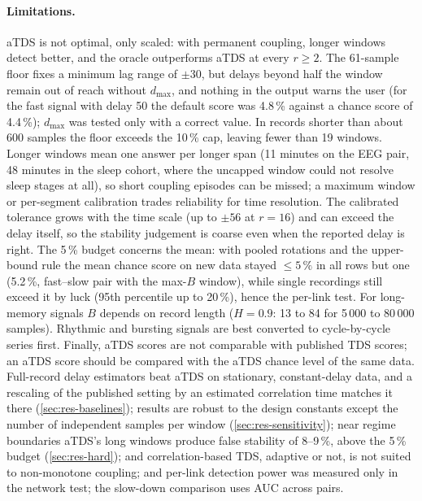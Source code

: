 \documentclass[11pt,a4paper]{article}
\begin{document}
\paragraph{Limitations.} aTDS is not optimal, only scaled: with permanent coupling, longer windows detect better, and the oracle outperforms aTDS at every $r \ge 2$. The 61-sample floor fixes a minimum lag range of $\pm30$, but delays beyond half the window remain out of reach without $d_{\max}$, and nothing in the output warns the user (for the fast signal with delay 50 the default score was 4.8\,\% against a chance score of 4.4\,\%); $d_{\max}$ was tested only with a correct value. In records shorter than about 600 samples the floor exceeds the 10\,\% cap, leaving fewer than 19 windows. Longer windows mean one answer per longer span (11 minutes on the EEG pair, 48 minutes in the sleep cohort, where the uncapped window could not resolve sleep stages at all), so short coupling episodes can be missed; a maximum window or per-segment calibration trades reliability for time resolution. The calibrated tolerance grows with the time scale (up to $\pm56$ at $r = 16$) and can exceed the delay itself, so the stability judgement is coarse even when the reported delay is right. The 5\,\% budget concerns the mean: with pooled rotations and the upper-bound rule the mean chance score on new data stayed $\le 5\,\%$ in all rows but one (5.2\,\%, fast--slow pair with the max-$B$ window), while single recordings still exceed it by luck (95th percentile up to 20\,\%), hence the per-link test. For long-memory signals $B$ depends on record length ($H = 0.9$: 13 to 84 for 5\,000 to 80\,000 samples). Rhythmic and bursting signals are best converted to cycle-by-cycle series first. Finally, aTDS scores are not comparable with published TDS scores; an aTDS score should be compared with the aTDS chance level of the same data. Full-record delay estimators beat aTDS on stationary, constant-delay data, and a rescaling of the published setting by an estimated correlation time matches it there (\cref{sec:res-baselines}); results are robust to the design constants except the number of independent samples per window (\cref{sec:res-sensitivity}); near regime boundaries aTDS's long windows produce false stability of 8--9\,\%, above the 5\,\% budget (\cref{sec:res-hard}); and correlation-based TDS, adaptive or not, is not suited to non-monotone coupling; and per-link detection power was measured only in the network test; the slow-down comparison uses AUC across pairs.
\end{document}
